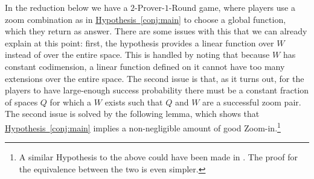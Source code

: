 \documentclass[11pt]{article}
\numberwithin{equation}{section}
\theoremstyle{definition}
\theoremstyle{plain}
\newcommand{\expref}[2]{\hyperref[#2]{#1~\ref{#2}}}
\begin{document}
%

In the reduction below we have a $2$-Prover-$1$-Round game, where
players use a zoom combination as in \expref{Hypothesis}{conj:main} to
choose a global function, which they return as answer. There are some
issues with this that we can already explain at this point: first, the
hypothesis provides a linear function over $W$ instead of over the entire
space. This is handled by noting that because $W$ has constant
codimension, a linear function defined on it cannot have too many
extensions over the entire space. The second issue is that, as it
turns out, for the players to have large-enough success probability
there must be a constant fraction of spaces $Q$ for which a $W$ exists
such that $Q$ and $W$ are a successful zoom pair. The second issue is
solved by the following lemma, which shows that
\expref{Hypothesis}{conj:main} implies a non-negligible amount of good
Zoom-in.\footnote{A similar Hypothesis
  to the above could have been made in \cite{KMS}. The proof for the
  equivalence between the two is even simpler.}
\end{document}
